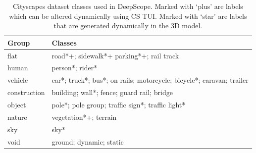 {{{            \begin{table}
                \begin{center}
                    \caption{
                        Cityscapes dataset classes used in DeepScope. Marked with `plus' are labels which can be altered dynamically using CS TUI. Marked with `star' are labels that are generated dynamically in the 3D model.
                    }
                    \label{deepscope:tab-types-classes}
                    \begin{tabular}{l|l}
                        \hline
                        \textbf{Group} & \textbf{Classes}                                                     \\
                        \hline
                        flat           & road*+; sidewalk*+ parking*+; rail track                             \\
                        human          & person*; rider*                                                      \\
                        vehicle        & car*; truck*; bus*; on rails; motorcycle; bicycle*; caravan; trailer \\
                        construction   & building; wall*; fence; guard rail; bridge                           \\
                        object         & pole*; pole group; traffic sign*; traffic light*                     \\
                        nature         & vegetation*+; terrain                                                \\
                        sky            & sky*                                                                 \\
                        void           & ground; dynamic; static
                    \end{tabular}
                \end{center}
            \end{table}
        }

}}
